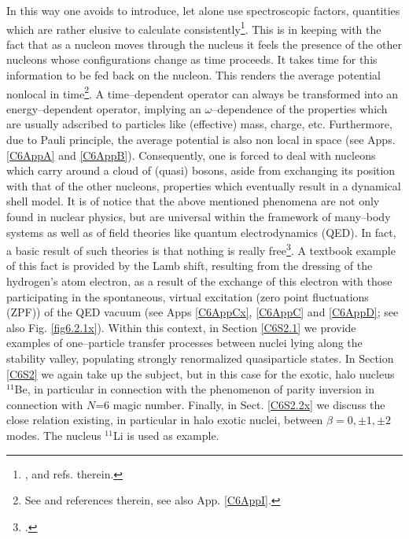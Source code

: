 In this way one avoids to introduce, let alone use spectroscopic factors, quantities which are rather elusive to calculate consistently\footnote{ \cite{Duguet:12,Jenning:11,Dickhoff:04,Dickhoff:05}, and refs. therein.}. This is in keeping with the fact that as a nucleon moves through the nucleus it feels the presence of the other nucleons whose configurations change as time proceeds. It takes time for this information to be fed back on the nucleon. This renders the average potential nonlocal in time\footnote{See \citet{Mahaux:85} and references therein, see also App. \ref{C6AppI}.}. A time--dependent operator can always be transformed into an energy--dependent operator, implying an $\omega$--dependence of the properties which are usually adscribed to particles like (effective) mass, charge, etc. Furthermore, due to  Pauli principle, the average potential is also non local in space (see Apps. \ref{C6AppA} and \ref{C6AppB}).  Consequently, one is forced to deal with nucleons which carry around a cloud of (quasi) bosons, aside from  exchanging its position with that of the other nucleons, properties which eventually result in a dynamical shell model.  It is of notice that the above mentioned phenomena are not only found in nuclear physics, but are universal within the framework of many--body systems as well as of field theories like quantum electrodynamics (QED). In fact, a basic result of such theories is that nothing is really free\footnote{\cite{Feynman:75}.}. A textbook example of this fact is provided by the Lamb shift, resulting from the dressing of the hydrogen's atom electron, as a result of the exchange of this electron with those participating in the spontaneous, virtual excitation (zero point fluctuations (ZPF)) of the QED vacuum (see Apps \ref{C6AppCx}, \ref{C6AppC} and \ref{C6AppD}; see also Fig. \ref{fig6.2.1x}).  Within this context, in Section \ref{C6S2.1} we provide examples of one--particle transfer processes between nuclei lying along the stability valley, populating strongly renormalized quasiparticle states.
In Section \ref{C6S2}  we again take up the subject, but in this case for the exotic, halo nucleus $^{11}$Be, in particular in connection with the   phenomenon of parity inversion in connection with  $N$=6 magic number. Finally, in Sect. \ref{C6S2.2x} we discuss the close relation existing, in particular in halo exotic nuclei, between $\beta=0,\pm1,\pm2$ modes. The nucleus $^{11}$Li is used as example.



